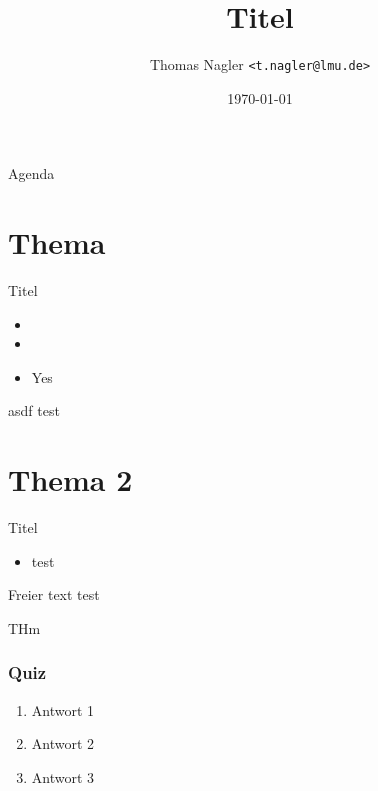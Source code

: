 \documentclass[11pt]{beamer}
\title{Titel}
\institute{Vorlesung}
\date{\today}
\author[T.~Nagler]{Thomas Nagler \texttt{<t.nagler@lmu.de>}}
\begin{document}

{ %
\begin{frame}[noframenumbering] 
	\titlepage
\end{frame}
}


\begin{frame}{Agenda}
	\tableofcontents
\end{frame}


\section{Thema}


\begin{frame}{Titel}

	\begin{itemize}
		\item {}    
		\item  {} 
		\item[\cmark] Yes
	\end{itemize}

	\begin{example}{asdf}
		test
	\end{example}
\end{frame}


\section{Thema 2}

\begin{frame}{Titel}


	\begin{itemize}
		\item test
	\end{itemize}

	\begin{block}{Freier text}
		test
	\end{block}

	\begin{theorem}
		THm
	\end{theorem}

\end{frame}


\begin{frame}
	\frametitle{Quiz}

	\begin{enumerate}
		\item Antwort 1
		\item Antwort 2
		\item Antwort 3 \onslide<2->{\cmark}
	\end{enumerate}

\end{frame}
\end{document}
